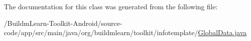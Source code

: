 The documentation for this class was generated from the following file\-:\begin{DoxyCompactItemize}
\item 
/\-Buildm\-Learn-\/\-Toolkit-\/\-Android/source-\/code/app/src/main/java/org/buildmlearn/toolkit/infotemplate/\hyperlink{infotemplate_2GlobalData_8java}{Global\-Data.\-java}\end{DoxyCompactItemize}
